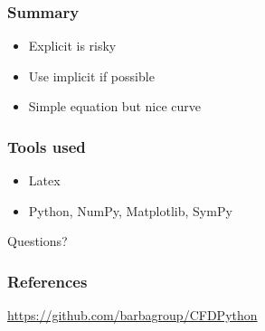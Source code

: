 %
%
%


\begin{frame}
  \frametitle{Summary}
  \begin{itemize}
    \item Explicit is risky
    \item Use implicit if possible
    \item Simple equation but nice curve
  \end{itemize}
\end{frame}

\begin{frame}
  \frametitle{Tools used}
  \begin{itemize}
    \item Latex
    \item Python, NumPy, Matplotlib, SymPy
  \end{itemize}
\end{frame}


\begin{frame}
\begin{center}
  \huge Questions?
\end{center}

\end{frame}

\begin{frame}
  \frametitle{References}
  \begin{center}
    \huge \url{https://github.com/barbagroup/CFDPython}
  \end{center}
\end{frame}
